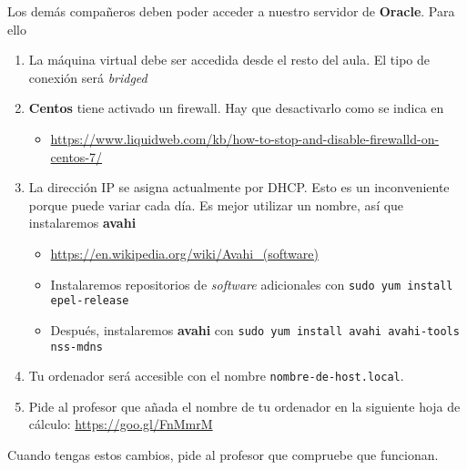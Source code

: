 \begin{homeworkProblem}



  Los demás compañeros deben poder acceder a nuestro servidor de \textbf{Oracle}. Para ello
  \begin{enumerate}
  \item La máquina virtual debe ser accedida desde el resto del aula. El tipo de conexión será \textit{bridged}
  \item \textbf{Centos} tiene activado un firewall. Hay que desactivarlo como se indica en
    \begin{itemize}
    \item  \url{https://www.liquidweb.com/kb/how-to-stop-and-disable-firewalld-on-centos-7/}
    \end{itemize}
    
  \item La dirección IP se asigna actualmente por DHCP. Esto es un inconveniente porque puede variar cada día. Es mejor utilizar un nombre, así que instalaremos \textbf{avahi}
    \begin{itemize}
    \item \url{https://en.wikipedia.org/wiki/Avahi\_(software)}
    \item Instalaremos repositorios de \textit{software} adicionales con \texttt{sudo yum install epel-release}
    \item Después, instalaremos \textbf{avahi} con \texttt{sudo yum install avahi avahi-tools nss-mdns}

    \end{itemize}

  \item Tu ordenador será accesible con el nombre \texttt{nombre-de-host.local}.
  \item Pide al profesor que añada el nombre de tu ordenador en la siguiente hoja de cálculo: \url{https://goo.gl/FnMmrM}
    
    
  \end{enumerate}

  Cuando tengas estos cambios, pide al profesor que compruebe que funcionan.
\end{homeworkProblem}


